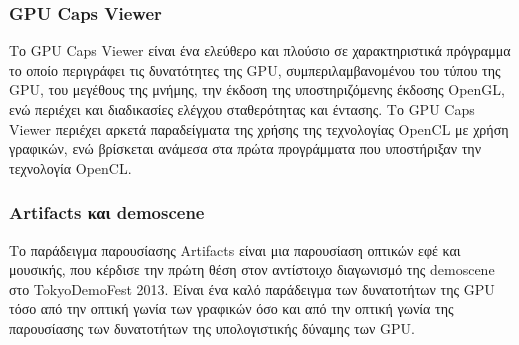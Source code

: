 \subsubsection{GPU Caps Viewer}
Το GPU Caps Viewer είναι ένα ελεύθερο και πλούσιο σε χαρακτηριστικά πρόγραμμα το οποίο περιγράφει τις δυνατότητες της GPU, συμπεριλαμβανομένου του τύπου της GPU, του μεγέθους της μνήμης, την έκδοση της υποστηριζόμενης έκδοσης OpenGL, ενώ περιέχει και διαδικασίες ελέγχου σταθερότητας και έντασης. Το GPU Caps Viewer περιέχει αρκετά παραδείγματα της χρήσης της τεχνολογίας OpenCL με χρήση γραφικών, ενώ βρίσκεται ανάμεσα στα πρώτα προγράμματα που υποστήριξαν την τεχνολογία OpenCL.
\subsubsection{Artifacts και demoscene}
Το παράδειγμα παρουσίασης Artifacts είναι μια παρουσίαση οπτικών εφέ και μουσικής, που κέρδισε την πρώτη θέση στον αντίστοιχο διαγωνισμό της demoscene στο TokyoDemoFest 2013. Είναι ένα καλό παράδειγμα των δυνατοτήτων της GPU τόσο από την οπτική γωνία των γραφικών όσο και από την οπτική γωνία της παρουσίασης των δυνατοτήτων της υπολογιστικής δύναμης των GPU.
